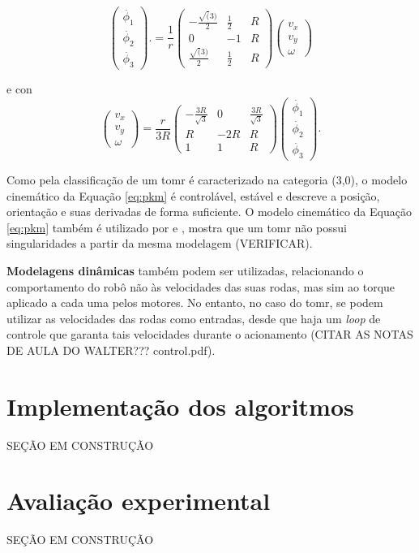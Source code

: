 \begin{equation}
  \begin{pmatrix}
    \dot{\phi_1} \\
    \dot{\phi_2} \\
    \dot{\phi_3}
  \end{pmatrix}.
  =
  \frac{1}{r}
  \begin{pmatrix}
    -\frac{\sqrt(3)}{2} & \frac{1}{2} & R \\
    0                   & -1          & R \\
    \frac{\sqrt(3)}{2}  & \frac{1}{2} & R
  \end{pmatrix}
  \begin{pmatrix}
    v_x \\
    v_y \\
    \omega
  \end{pmatrix}
  \label{eq:ik}
\end{equation}

e
con
\begin{equation}
  \begin{pmatrix}
    v_x \\
    v_y \\
    \omega
  \end{pmatrix}
  =
  \frac{r}{3R}
  \begin{pmatrix}
    -\frac{3R}{\sqrt{3}} & 0   & \frac{3R}{\sqrt{3}} \\
    R                    & -2R & R                   \\
    1                    & 1   & R
  \end{pmatrix}
  \begin{pmatrix}
    \dot{\phi_1} \\
    \dot{\phi_2} \\
    \dot{\phi_3}
  \end{pmatrix}.
  \label{eq:dk}
\end{equation}


Como pela classificação de \cite{campion1996structural} um \acrshort{tomr} é caracterizado na categoria (3,0), o modelo cinemático da Equação \ref{eq:pkm} é controlável, estável e descreve a posição, orientação e suas derivadas de forma suficiente. O modelo cinemático da Equação \ref{eq:pkm} também é utilizado por \cite{rojas2006holonomic} e \cite{ritter2016modelagem}, \cite{loh2003mechatronics} mostra que um \acrshort{tomr} não possui singularidades a partir da mesma modelagem (VERIFICAR).

\textbf{Modelagens dinâmicas} também podem ser utilizadas, relacionando o comportamento do robô não às velocidades das suas rodas, mas sim ao torque aplicado a cada uma pelos motores. No entanto, no caso do \acrshort{tomr}, se podem utilizar as velocidades das rodas como entradas, desde que haja um \emph{loop} de controle que garanta tais velocidades durante o acionamento (CITAR AS NOTAS DE AULA DO WALTER??? control.pdf).

\section{Implementação dos algoritmos}
\label{sec:software}

SEÇÃO EM CONSTRUÇÃO

\section{Avaliação experimental}
\label{sec:experimental}

SEÇÃO EM CONSTRUÇÃO
